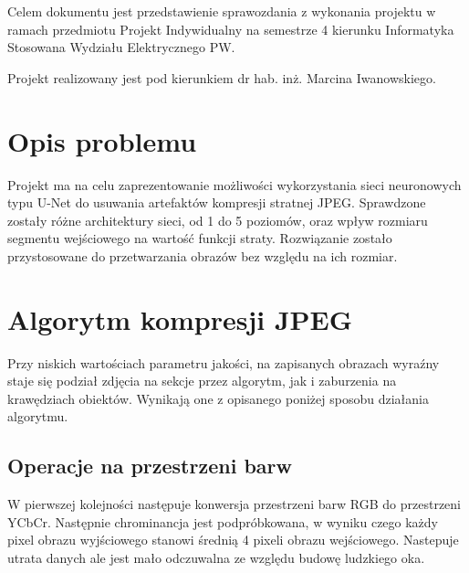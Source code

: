 \documentclass[a4paper, 12pt]{article}
\begin{document}
\maketitle
\thispagestyle{empty}
\newpage
\thispagestyle{empty}
Celem dokumentu jest przedstawienie sprawozdania z wykonania projektu w ramach przedmiotu Projekt Indywidualny na semestrze 4 kierunku Informatyka Stosowana Wydziału Elektrycznego PW.
\begin{center}
Projekt realizowany jest pod kierunkiem dr hab. inż. Marcina Iwanowskiego.
\end{center}
\thispagestyle{empty}
\newpage
\tableofcontents
\thispagestyle{empty}

\newpage
\section{Opis problemu}
\indent Projekt ma na celu zaprezentowanie możliwości wykorzystania sieci neuronowych typu U-Net do usuwania artefaktów kompresji stratnej JPEG.
Sprawdzone zostały różne architektury sieci, od 1 do 5 poziomów, oraz wpływ rozmiaru segmentu wejściowego na wartość funkcji straty.
Rozwiązanie zostało przystosowane do przetwarzania obrazów bez względu na ich rozmiar.
\section{Algorytm kompresji JPEG}
Przy niskich wartościach parametru jakości, na zapisanych obrazach wyraźny staje się podział zdjęcia na sekcje przez algorytm,
jak i zaburzenia na krawędziach obiektów. Wynikają one z opisanego poniżej sposobu działania algorytmu. \cite{JPEG}
\subsection{Operacje na przestrzeni barw}
W pierwszej kolejności następuje konwersja przestrzeni barw RGB do przestrzeni YCbCr.
Następnie chrominancja jest podpróbkowana, w wyniku czego każdy pixel obrazu wyjściowego stanowi średnią 4 pixeli obrazu wejściowego.
Nastepuje utrata danych ale jest mało odczuwalna ze względu budowę ludzkiego oka.
\end{document}
